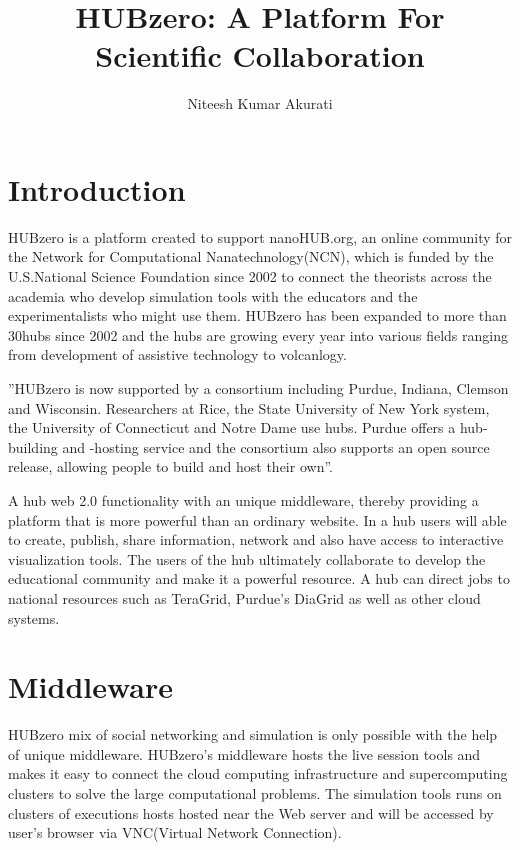 \documentclass[9pt,twocolumn,twoside]{../../styles/osajnl}
\title{HUBzero: A Platform For Scientific Collaboration}
\author[1,*]{Niteesh Kumar Akurati}
\affil[1]{School of Informatics and Computing, Bloomington, IN 47408, U.S.A.}
\affil[*]{Corresponding authors: akuratin@indiana.edu}
\begin{document}
\maketitle

\section{Introduction}
HUBzero is a platform created to support nanoHUB.org, an online
community for the Network for Computational Nanatechnology(NCN), which
is funded by the U.S.National Science Foundation since 2002 to connect
the theorists across the academia who develop simulation tools with
the educators and the experimentalists who might use them. HUBzero has
been expanded to more than 30hubs since 2002 and the hubs are growing
every year into various fields ranging from development of assistive
technology to volcanlogy\cite{mclennan2010hubzero}.

''HUBzero is now supported by a consortium including Purdue, Indiana,
Clemson and Wisconsin. Researchers at Rice, the State University of
New York system, the University of Connecticut and Notre Dame use
hubs. Purdue offers a hub-building and -hosting service and the
consortium also supports an open source release, allowing people to
build and host their own''\cite{hpcwireacrticle2011}.

A hub web 2.0 functionality with an unique middleware, thereby
providing a platform that is more powerful than an ordinary website.
In a hub users will able to create, publish, share information,
network and also have access to interactive visualization tools. The
users of the hub ultimately collaborate to develop the educational
community and make it a powerful resource. A hub can direct jobs to
national resources such as TeraGrid, Purdue's DiaGrid as well as other
cloud systems\cite{hpcwirearticle2011}.


\section{Middleware}
HUBzero mix of social networking and simulation is only possible with
the help of unique middleware. HUBzero's middleware hosts the live
session tools and makes it easy to connect the cloud computing
infrastructure and supercomputing clusters to solve the large
computational problems. The simulation tools runs on clusters of
executions hosts hosted near the Web server and will be accessed by
user's browser via VNC(Virtual Network Connection)\cite{mclennan2010hubzero}.
\end{document}
